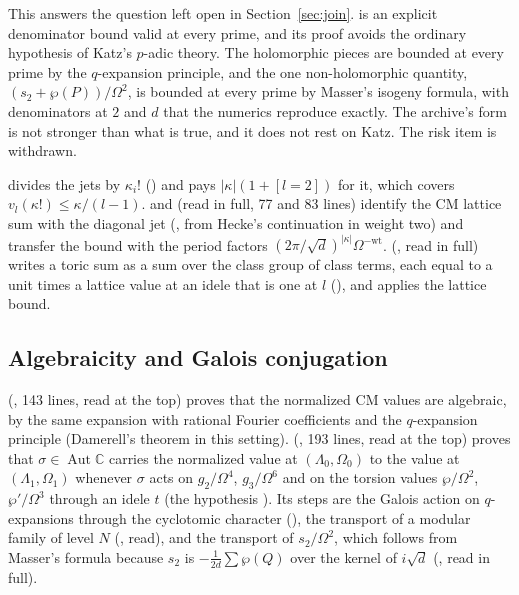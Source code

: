 \documentclass[11pt]{article}
\theoremstyle{remark}
\begin{document}
This answers the question left open in Section~\ref{sec:join}.  is an explicit denominator bound valid at every prime, and its proof avoids the ordinary hypothesis of Katz's $p$-adic theory. The holomorphic pieces are bounded at every prime by the $q$-expansion principle, and the one non-holomorphic quantity, $(s_2+\wp(P))/\Omega^2$, is bounded at every prime by Masser's isogeny formula, with denominators at $2$ and $d$ that the numerics reproduce exactly. The archive's form is not stronger than what is true, and it does not rest on Katz. The risk item is withdrawn.

 divides the jets by $\kappa_i!$ () and pays $\lvert\kappa\rvert(1+[l=2])$ for it, which covers $v_l(\kappa!)\le\kappa/(l-1)$.  and  (read in full, 77 and 83 lines) identify the CM lattice sum with the diagonal jet (, from Hecke's continuation in weight two) and transfer the bound with the period factors $(2\pi/\sqrt d)^{\lvert\kappa\rvert}\Omega^{-\mathrm{wt}}$.  (, read in full) writes a toric sum as a sum over the class group of class terms, each equal to a unit times a lattice value at an idele that is one at $l$ (), and applies the lattice bound.

\subsection{Algebraicity and Galois conjugation}

 (, 143 lines, read at the top) proves that the normalized CM values are algebraic, by the same expansion with rational Fourier coefficients and the $q$-expansion principle (Damerell's theorem in this setting).  (, 193 lines, read at the top) proves that $\sigma\in\operatorname{Aut}\mathbb C$ carries the normalized value at $(\Lambda_0,\Omega_0)$ to the value at $(\Lambda_1,\Omega_1)$ whenever $\sigma$ acts on $g_2/\Omega^4$, $g_3/\Omega^6$ and on the torsion values $\wp/\Omega^2$, $\wp'/\Omega^3$ through an idele $t$ (the hypothesis ). Its steps are the Galois action on $q$-expansions through the cyclotomic character (), the transport of a modular family of level $N$ (, read), and the transport of $s_2/\Omega^2$, which follows from Masser's formula because $s_2$ is $-\frac1{2d}\sum\wp(Q)$ over the kernel of $i\sqrt d$ (, read in full).
\end{document}
